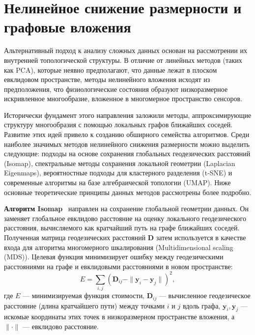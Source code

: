 \section{Нелинейное снижение размерности и графовые вложения}
\label{sec:nonlinear_methods}

Альтернативный подход к анализу сложных данных основан на рассмотрении их внутренней топологической структуры. В отличие от линейных методов (таких как PCA), которые неявно предполагают, что данные лежат в плоском евклидовом пространстве, методы нелинейного вложения исходят из предположения, что физиологические состояния образуют низкоразмерное искривленное многообразие, вложенное в многомерное пространство сенсоров.

Исторически фундамент этого направления заложили методы, аппроксимирующие структуру многообразия с помощью локальных графов ближайших соседей. Развитие этих идей привело к созданию обширного семейства алгоритмов. Среди наиболее значимых методов нелинейного снижения размерности можно выделить следующие: подходы на основе сохранения глобальных геодезических расстояний (Isomap), спектральные методы сохранения локальной геометрии (Laplacian Eigenmaps), вероятностные подходы для кластерного разделения (t-SNE) и современные алгоритмы на базе алгебраической топологии (UMAP). Ниже основные теоретические принципы данных методов рассмотрены более подробно.

\textbf{Алгоритм Isomap}~\cite{tenenbaum2000isomap} направлен на сохранение глобальной геометрии данных. Он заменяет глобальное евклидово расстояние на оценку локального геодезического расстояния, вычисляемого как кратчайший путь на графе ближайших соседей. Полученная матрица геодезических расстояний $\mathbf{D}$ затем используется в качестве входа для алгоритма многомерного шкалирования (Multidimensional scaling (MDS)). Целевая функция минимизирует ошибку между геодезическими расстояниями на графе и евклидовыми расстояниями в новом пространстве:
\begin{equation}
	E = \sum_{i,j} \left( \mathbf{D}_{ij} - \|\mathbf{y}_i - \mathbf{y}_j\| \right)^2,
\end{equation}
где $E$ --- минимизируемая функция стоимости, $\mathbf{D}_{ij}$ --- вычисленное геодезическое расстояние (длина кратчайшего пути) между точками $i$ и $j$ вдоль графа, $\mathbf{y}_i, \mathbf{y}_j$ --- искомые координаты этих точек в низкоразмерном пространстве вложения, а $\|\cdot\|$ --- евклидово расстояние.

